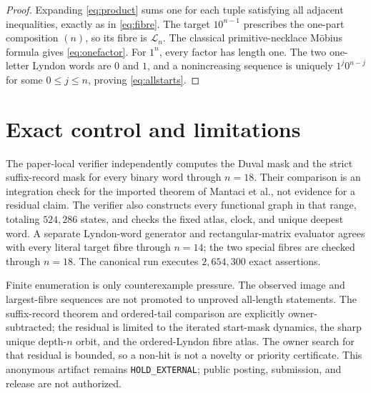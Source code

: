 \documentclass[10pt,a4paper]{amsart}
\theoremstyle{definition}
\theoremstyle{remark}
\newcommand{\Lyn}{\mathcal L}
\begin{document}
\begin{proof}
Expanding \eqref{eq:product} sums one for each tuple satisfying all adjacent
inequalities, exactly as in \eqref{eq:fibre}.  The target $10^{n-1}$
prescribes the one-part composition $(n)$, so its fibre is $\Lyn_n$.  The
classical primitive-necklace M\"obius formula gives \eqref{eq:onefactor}.
For $1^n$, every factor has length one.  The two one-letter Lyndon words are
$0$ and $1$, and a nonincreasing sequence is uniquely $1^j0^{n-j}$ for some
$0\le j\le n$, proving \eqref{eq:allstarts}.
\end{proof}

\section{Exact control and limitations}

The paper-local verifier independently computes the Duval mask and the strict
suffix-record mask for every binary word through $n=18$.  Their comparison is
an integration check for the imported theorem of Mantaci et al., not evidence
for a residual claim.  The verifier also constructs every functional graph in
that range, totaling $524{,}286$ states, and checks the fixed atlas, clock, and
unique deepest word.  A separate Lyndon-word generator and rectangular-matrix
evaluator agrees with every literal target fibre through $n=14$; the two
special fibres are checked through $n=18$.  The canonical run executes
$2{,}654{,}300$ exact assertions.

Finite enumeration is only counterexample pressure.  The observed image and
largest-fibre sequences are not promoted to unproved all-length statements.
The suffix-record theorem and ordered-tail comparison are explicitly
owner-subtracted; the residual is limited to the iterated start-mask dynamics,
the sharp unique depth-$n$ orbit, and the ordered-Lyndon fibre atlas.  The
owner search for that residual is bounded, so a non-hit is not a novelty or
priority certificate.  This anonymous artifact remains
\texttt{HOLD\_EXTERNAL}; public posting, submission, and release are not
authorized.



\end{document}
